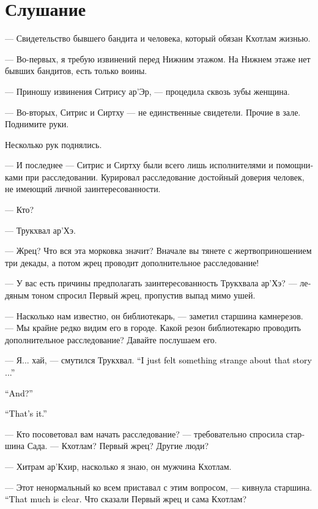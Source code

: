 \documentclass[a4paper,12pt,fleqn]{book}\usepackage{cooltooltips}\usepackage{polyglossia}\setdefaultlanguage[babelshorthands=true]{russian}\setotherlanguage{english}\defaultfontfeatures{Ligatures=TeX,Mapping=tex-text} \usepackage{xcolor}\definecolor{lightgray}{HTML}{bbbbbb}\color{lightgray}\newcommand{\ml}[3]{\textenglish{\textcolor{black}{#3}} }
\begin{document}
\section{Слушание}

--- Свидетельство бывшего бандита и человека, который обязан Кхотлам жизнью.

--- Во-первых, я требую извинений перед Нижним этажом.
На Нижнем этаже нет бывших бандитов, есть только воины.

--- Приношу извинения Ситрису ар'Эр, --- процедила сквозь зубы женщина.

--- Во-вторых, Ситрис и Сиртху --- не единственные свидетели.
Прочие в зале.
Поднимите руки.

Несколько рук поднялись.

--- И последнее --- Ситрис и Сиртху были всего лишь исполнителями и помощниками при расследовании.
Курировал расследование достойный доверия человек, не имеющий личной заинтересованности.

--- Кто?

--- Трукхвал ар'Хэ.

--- Жрец?
Что вся эта морковка значит?
Вначале вы тянете с жертвоприношением три декады, а потом жрец проводит дополнительное расследование!

--- У вас есть причины предполагать заинтересованность Трукхвала ар'Хэ? --- ледяным тоном спросил Первый жрец, пропустив выпад мимо ушей.

--- Насколько нам известно, он библиотекарь, --- заметил старшина камнерезов.
--- Мы крайне редко видим его в городе.
Какой резон библиотекарю проводить дополнительное расследование?
Давайте послушаем его.

--- Я... хай, --- смутился Трукхвал.
\ml{$0$}
{--- Мне просто показалось, что не вяжется что-то в этой истории...}
{``I just felt something strange about that story ...''}

\ml{$0$}
{--- И всё?}
{``And?''}

\ml{$0$}
{--- Всё.}
{``That's it.''}

--- Кто посоветовал вам начать расследование? --- требовательно спросила старшина Сада.
--- Кхотлам?
Первый жрец?
Другие люди?

--- Хитрам ар'Кхир, насколько я знаю, он мужчина Кхотлам.

--- Этот ненормальный ко всем приставал с этим вопросом, --- кивнула старшина.
\ml{$0$}
{--- В общем, понятно.}
{``That much is clear.}
Что сказали Первый жрец и сама Кхотлам?
\end{document}
